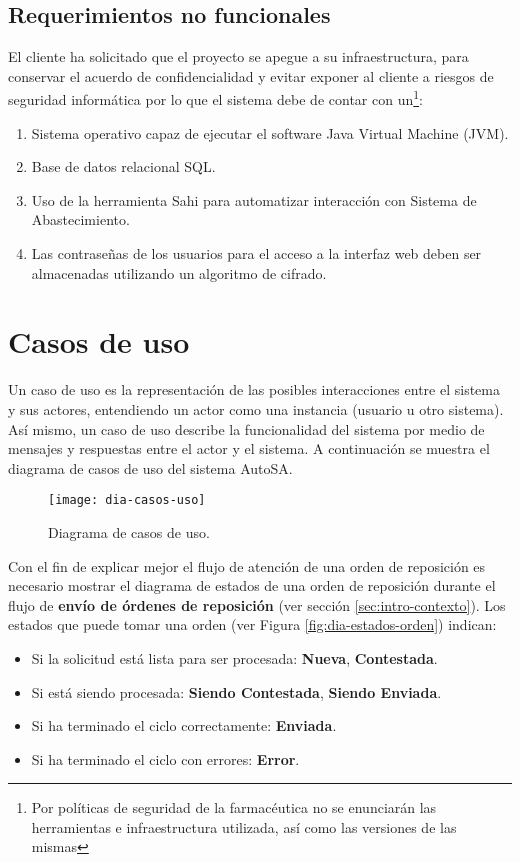 \subsection{Requerimientos no funcionales}\label{sec:nonfunctional-req}
El cliente ha solicitado que el proyecto se apegue a su infraestructura, para conservar el acuerdo de confidencialidad y evitar exponer al cliente a riesgos de seguridad informática por lo que el sistema debe de contar con un\footnote{Por políticas de seguridad de la farmacéutica no se enunciarán las herramientas e infraestructura utilizada, así como las versiones de las mismas}:
\begin{enumerate}
\item Sistema operativo capaz de ejecutar el software Java Virtual Machine (JVM).
\item Base de datos relacional SQL.
\item Uso de la herramienta Sahi para automatizar interacción con Sistema de Abastecimiento.
\item Las contraseñas de los usuarios para el acceso a la interfaz web deben ser almacenadas utilizando un algoritmo de cifrado.
\end{enumerate}




\section{Casos de uso}
Un caso de uso es la representación de las posibles interacciones entre el sistema y sus actores, entendiendo un actor como una instancia (usuario u otro sistema). Así mismo, un caso de uso describe la funcionalidad del sistema por medio de mensajes y respuestas entre el actor y el sistema\cite{ApressSE}. A continuación se muestra el diagrama de casos de uso del sistema AutoSA.

\begin{figure}[h]
  \centering
  \texttt{[image: dia-casos-uso]} 
  \caption{Diagrama de casos de uso.}
  \label{fig:dia-casos-uso}
\end{figure}

Con el fin de explicar mejor el flujo de atención de una orden de reposición es necesario mostrar el diagrama de estados de una orden de reposición durante el flujo de \textbf{envío de órdenes de reposición} (ver sección \ref{sec:intro-contexto}). Los estados que puede tomar una orden (ver Figura \ref{fig:dia-estados-orden}) indican:
\begin{itemize}
  \item Si la solicitud está lista para ser procesada: \textbf{Nueva}, \textbf{Contestada}.
  \item Si está siendo procesada: \textbf{Siendo Contestada}, \textbf{Siendo Enviada}.
  \item Si ha terminado el ciclo correctamente: \textbf{Enviada}.
  \item Si ha terminado el ciclo con errores: \textbf{Error}.
\end{itemize} 

